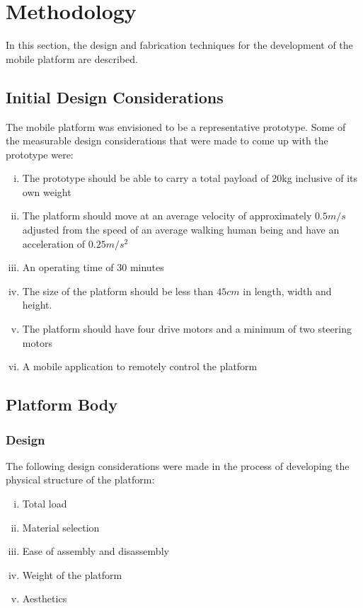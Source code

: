 \section{Methodology}
In this section, the design and fabrication techniques for the development of the mobile platform are described. 

\subsection{Initial Design Considerations}
\label{sec:initial}
The mobile platform was envisioned to be a representative prototype. Some of the measurable design considerations that were made to come up with the prototype were:

\begin{enumerate}[i.]
    \item The prototype should be able to carry a total payload of 20kg inclusive of its own weight
    \item The platform should move at an average velocity of approximately $0.5m/s$ adjusted from the speed of an average walking human being and have an acceleration of $0.25 m/s^2$
    \item An operating time of 30 minutes
    \item The size of the platform should be less than $45cm$ in length, width and height. 
    \item The platform should have four drive motors and a minimum of two steering motors
    \item A mobile application to remotely control the platform
\end{enumerate}

\subsection{Platform Body}
\subsubsection{Design}
\label{sec:bodydesign}
The following design considerations were made in the process of developing the physical structure of the platform: 
\begin{enumerate}[i.]
    \item Total load
    \item Material selection
    \item Ease of assembly and disassembly
    \item Weight of the platform
    \item Aesthetics
\end{enumerate}

